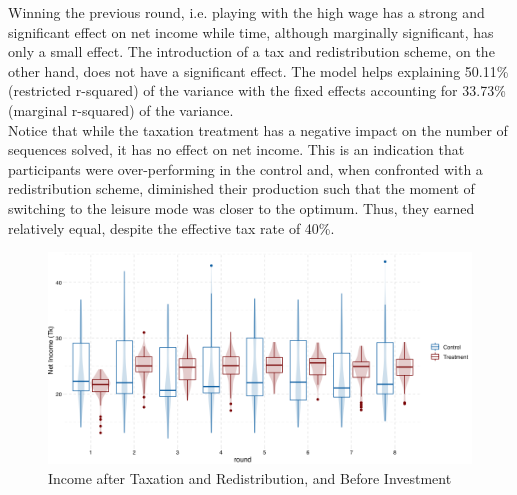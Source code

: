Winning the previous round, i.e. playing with the high wage has a strong and significant effect on net income while time, although marginally significant, has only a small effect. The introduction of a tax and redistribution scheme, on the other hand, does not have a significant effect. The model helps explaining 50.11\% (restricted r-squared) of the variance with the fixed effects accounting for 33.73\% (marginal r-squared) of the variance.\\

Notice that while the taxation treatment has a negative impact on the number of sequences solved, it has no effect on net income. This is an indication that participants were over-performing in the control and, when confronted with a redistribution scheme, diminished their production such that the moment of switching to the leisure mode was closer to the optimum. Thus, they earned relatively equal, despite the effective tax rate of 40\%.\\

\begin{figure}
    \centering
    \includegraphics[width=\textwidth]{graphs/earnings_boxplot.png}
    \caption{Income after Taxation and Redistribution, and Before Investment}
    \label{fig:earnings_boxplot}
\end{figure}


